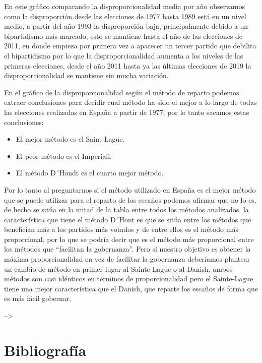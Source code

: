 \documentclass[12pt,a4paper,]{book}
\def\ifdoblecara{} %
\def\ifcitapandoc{} %
\let\ifcitapandoc\undefined %
\providecommand{\tightlist}{%
  \setlength{\itemsep}{0pt}\setlength{\parskip}{0pt}}
\numberwithin{dummy}{section}
\theoremstyle{ocrenumbox}
\theoremstyle{blacknumex}
\theoremstyle{blacknumbox}
\theoremstyle{ocrenum}
\theoremstyle{ocrenum}
\begin{document}
En este gráfico comparando la disproporcionalidad media por año
observamos como la disproporción desde las elecciones de 1977 hasta 1989
está en un nivel medio, a partir del año 1993 la disproporción baja,
principalmente debido a un bipartidismo más marcado, esto se mantiene
hasta el año de las elecciones de 2011, en donde empieza por primera vez
a aparecer un tercer partido que debilita el bipartidismo por lo que la
disproporcionalidad aumenta a los niveles de las primeras elecciones,
desde el año 2011 hasta ya las últimas elecciones de 2019 la
disproporcionalidad se mantiene sin mucha variación.

En el gráfico de la disproporcionalidad según el método de reparto
podemos extraer conclusiones para decidir cual método ha sido el mejor a
lo largo de todas las elecciones realizadas en España a partir de 1977,
por lo tanto sacamos estas conclusiones:

\begin{itemize}
\tightlist
\item
  El mejor método es el Saint-Lague.
\item
  El peor método es el Imperiali.
\item
  El método D´Hondt es el cuarto mejor método.
\end{itemize}

Por lo tanto al preguntarnos si el método utilizado en España es el
mejor método que se puede utilizar para el reparto de los escaños
podemos afirmar que no lo es, de hecho se sitúa en la mitad de la tabla
entre todos los métodos analizados, la característica que tiene el
método D´Hont es que se sitúa entre los métodos que benefician más a los
partidos más votados y de entre ellos es el método más proporcional, por
lo que se podría decir que es el método más proporcional entre los
métodos que ``facilitan la gobernanza''. Pero si nuestro objetivo es
obtener la máxima proporcionalidad en vez de facilitar la gobernanza
deberíamos plantear un cambio de método en primer lugar al Sainte-Lague
o al Danish, ambos métodos son casi idénticos en términos de
proporcionalidad pero el Sainte-Lague tiene una mejor característica que
el Danish, que reparte los escaños de forma que es más fácil gobernar.

--\textgreater{}

\FloatBarrier
\cleardoublepage

\ifdefined\ifdoblecara
  \fancyhead[LE,RO]{}
  \fancyfoot[LO,RE]{}
\else
  \fancyhead[RO]{}
  \fancyfoot[LO]{}
\fi

\ifdefined\ifcitapandoc

\hypertarget{bibliografuxeda}{%
\chapter*{Bibliografía}\label{bibliografuxeda}}

\else

\nocite{*}

\fi




\end{document}
